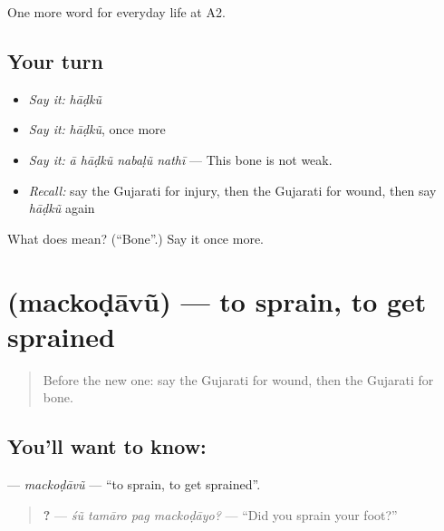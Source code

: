 \begin{grammarlens}[title={What you've built}]
One more word for everyday life at A2.
\end{grammarlens}

\subsection*{Your turn}
\begin{itemize}
\raggedright
  \item \emph{Say it:} \emph{hāḍkũ}
  \item \emph{Say it:} \emph{hāḍkũ}, once more
  \item \emph{Say it:} \emph{ā hāḍkũ nabaḷũ nathī} — This bone is not weak.
  \item \emph{Recall:} say the Gujarati for injury, then the Gujarati for wound, then say \emph{hāḍkũ} again
\end{itemize}

\begin{tcolorbox}[breakable,colback=teal!4,colframe=teal!35!black,title={Before you move on}]
What does  mean? (\textquotedblleft{}Bone\textquotedblright{}.) Say it once more.
\end{tcolorbox}
\section[\texorpdfstring{\gu{મચકોડાવું} (mackoḍāvũ)}{મચકોડાવું (mackoḍāvũ)}]{ (mackoḍāvũ) — to sprain, to get sprained}

\label{lesson:GU-C227-mackodavu}



\begin{quote}
Before the new one: say the Gujarati for wound, then the Gujarati for bone.
\end{quote}

\subsection*{You'll want to know: }
\textbf{} — \emph{mackoḍāvũ} — \textquotedblleft{}to sprain, to get sprained\textquotedblright{}.

\begin{quote}
\textbf{   ?} — \emph{śũ tamāro pag mackoḍāyo?} — \textquotedblleft{}Did you sprain your foot?\textquotedblright{}
\end{quote}


